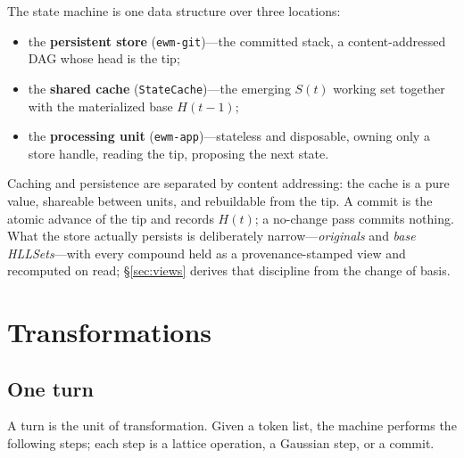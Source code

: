 \documentclass[11pt,a4paper]{article}
\theoremstyle{remark}
\begin{document}
The state machine is one data structure over three locations:
\begin{itemize}[leftmargin=*,nosep]
  \item the \textbf{persistent store} (\texttt{ewm-git})---the committed stack,
    a content-addressed DAG whose head is the tip;
  \item the \textbf{shared cache} (\texttt{StateCache})---the emerging $S(t)$
    working set together with the materialized base $H(t{-}1)$;
  \item the \textbf{processing unit} (\texttt{ewm-app})---stateless and
    disposable, owning only a store handle, reading the tip, proposing the next
    state.
\end{itemize}
Caching and persistence are separated by content addressing: the cache is a pure
value, shareable between units, and rebuildable from the tip. A commit is the
atomic advance of the tip and records $H(t)$; a no-change pass commits nothing.
What the store actually persists is deliberately narrow---\emph{originals} and
\emph{base HLLSets}---with every compound held as a provenance-stamped view
and recomputed on read; \S\ref{sec:views} derives that discipline from the
change of basis.

\section{Transformations}
\label{sec:transforms}

\subsection{One turn}

A turn is the unit of transformation. Given a token list, the machine performs
the following steps; each step is a lattice operation, a Gaussian step, or a
commit.
\end{document}
